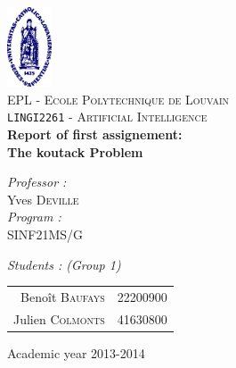 \begin{titlepage}
 
\begin{center}
 
\vspace*{-2cm}\includegraphics[width=0.10\textwidth]{ucl.png}\\[1cm]
 
\textsc{\LARGE EPL - Ecole Polytechnique de Louvain}\\[1.5cm]
 
\textsc{\Large \texttt{LINGI2261} - Artificial Intelligence}\\[0.5cm]
 
 
\vspace{1.0cm}
{ \huge \bfseries Report of first assignement:\\The koutack Problem\\\vspace{0.8cm}}
 
\vspace{1.0cm}
 
\begin{minipage}{0.4\textwidth}
\begin{flushleft} \large
\emph{Professor :}\\
	Yves \textsc{Deville}\\
\vspace{1cm}
\emph{Program :}\\
	SINF21MS/G
\end{flushleft}
\end{minipage}
\begin{minipage}{0.4\textwidth}
\begin{flushright} \large
\emph{Students : (Group 1)} \\
\begin{tabular}{rl}
	Benoît \textsc{Baufays}		& {\footnotesize 22200900}\\
	Julien \textsc{Colmonts}	& {\footnotesize 41630800}\\
\end{tabular}
\end{flushright}
\end{minipage}
 
\vfill
 
\vspace{1.1cm}
{\large Academic year 2013-2014}
\vspace{-1cm} 
\end{center}
 
\end{titlepage}
